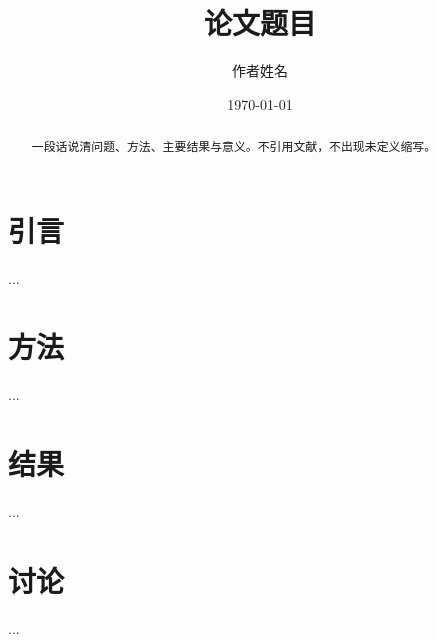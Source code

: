 \documentclass[UTF8,a4paper,12pt]{ctexart}
\title{论文题目}
\author{作者姓名}
\date{\today}
\begin{document}
\maketitle

\begin{abstract}
一段话说清问题、方法、主要结果与意义。不引用文献，不出现未定义缩写。
\end{abstract}

\section{引言}\label{sec:introduction}
...

\section{方法}\label{sec:method}
...

\section{结果}\label{sec:results}
...

\section{讨论}\label{sec:discussion}
...



\end{document}

